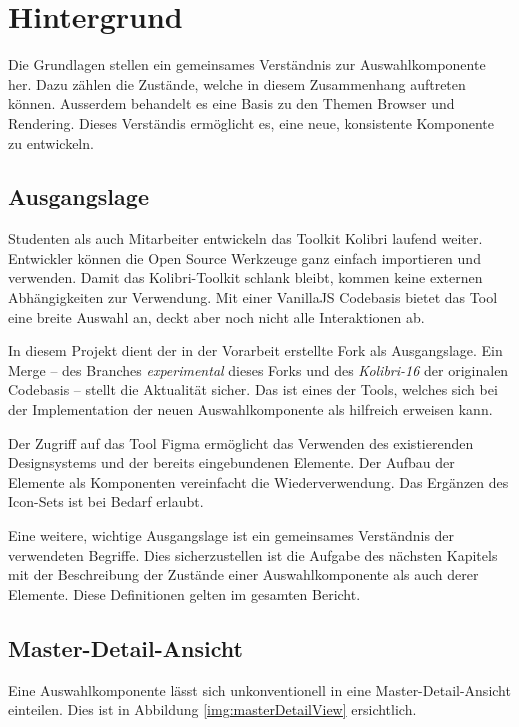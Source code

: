 \chapter{Hintergrund}
\label{chap:background}

Die Grundlagen stellen ein gemeinsames Verständnis zur Auswahlkomponente her.
Dazu zählen die Zustände, welche in diesem Zusammenhang auftreten können.
Ausserdem behandelt es eine Basis zu den Themen Browser und Rendering. 
Dieses Verständis ermöglicht es, eine neue, konsistente Komponente zu entwickeln.


\section{Ausgangslage}
\label{sec:basics}

Studenten als auch Mitarbeiter entwickeln das Toolkit Kolibri laufend weiter.
Entwickler können die Open Source Werkzeuge ganz einfach importieren und verwenden.
Damit das Kolibri-Toolkit schlank bleibt, kommen keine externen Abhängigkeiten zur Verwendung.
Mit einer VanillaJS Codebasis bietet das Tool eine breite Auswahl an, deckt aber noch nicht alle Interaktionen ab.

In diesem Projekt dient der in der Vorarbeit erstellte Fork als Ausgangslage.
Ein Merge – des Branches \emph{experimental} dieses Forks und des \emph{Kolibri-16} der originalen Codebasis – stellt die Aktualität sicher.
Das  ist eines der Tools, welches sich bei der Implementation der neuen Auswahlkomponente als hilfreich erweisen kann.

Der Zugriff auf das Tool Figma ermöglicht das Verwenden des existierenden Designsystems und der bereits eingebundenen Elemente. 
Der Aufbau der Elemente als Komponenten vereinfacht die Wiederverwendung. 
Das Ergänzen des Icon-Sets ist bei Bedarf erlaubt.

Eine weitere, wichtige Ausgangslage ist ein gemeinsames Verständnis der verwendeten Begriffe. 
Dies sicherzustellen ist die Aufgabe des nächsten Kapitels mit der Beschreibung der Zustände einer Auswahlkomponente als auch derer Elemente.
Diese Definitionen gelten im gesamten Bericht.


\section{Master-Detail-Ansicht}
\label{sec:masterDetailView}

Eine Auswahlkomponente lässt sich unkonventionell in eine Master-Detail-Ansicht einteilen.
Dies ist in Abbildung \ref{img:masterDetailView} ersichtlich.


